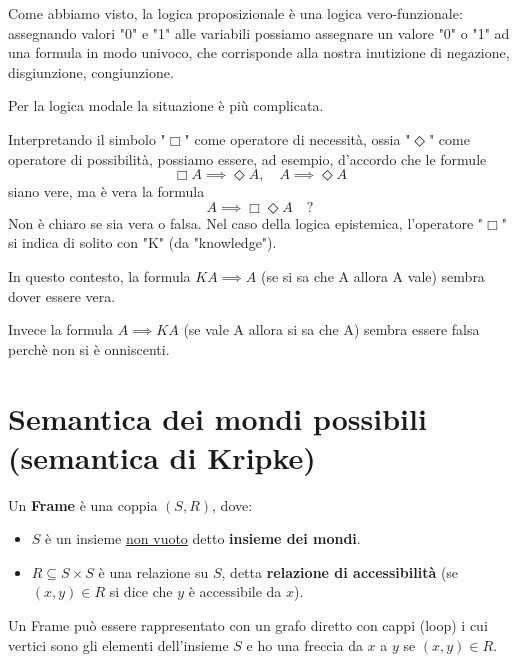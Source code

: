 \documentclass[../main.tex]{subfiles}
\begin{document}
Come abbiamo visto, la logica proposizionale è una logica vero-funzionale: assegnando valori "0" e "1" alle variabili possiamo assegnare un valore "0" o "1" ad una formula in modo univoco, che corrisponde alla nostra inutizione di negazione, disgiunzione, congiunzione.

Per la logica modale la situazione è più complicata.

Interpretando il simbolo "$\Box$" come operatore di necessità, ossia "$\Diamond$" come operatore di possibilità, possiamo essere, ad esempio, d'accordo che le formule
\begin{equation*}
    \Box A \implies \Diamond A, \quad A \implies \Diamond A
\end{equation*}
siano vere, ma è vera la formula
\begin{equation*}
    A \implies \Box \Diamond A \quad \text{?}
\end{equation*}
Non è chiaro se sia vera o falsa. Nel caso della logica epistemica, l'operatore "$\Box$" si indica di solito con "K" (da "knowledge").

In questo contesto, la formula $KA \implies A$ (se si sa che A allora A vale) sembra dover essere vera.

Invece la formula $A \implies KA$ (se vale A allora si sa che A) sembra essere falsa perchè non si è onniscenti.

\section{Semantica dei mondi possibili (semantica di Kripke)}
\begin{definition}[Frame]
    Un \textbf{Frame} è una coppia $(S,R)$, dove:
    \begin{itemize}
        \item $S$ è un insieme \underline{non vuoto} detto \textbf{insieme dei mondi}.
        \item $R \subseteq S \times S$ è una relazione su $S$, detta \textbf{relazione di accessibilità} (se $(x,y) \in R$ si dice che $y$ è accessibile da $x$).
    \end{itemize}
\end{definition}
Un Frame può essere rappresentato con un grafo diretto con cappi (loop) i cui vertici sono gli elementi dell'insieme $S$ e ho una freccia da $x$ a $y$ se $(x,y) \in R$.
\end{document}
